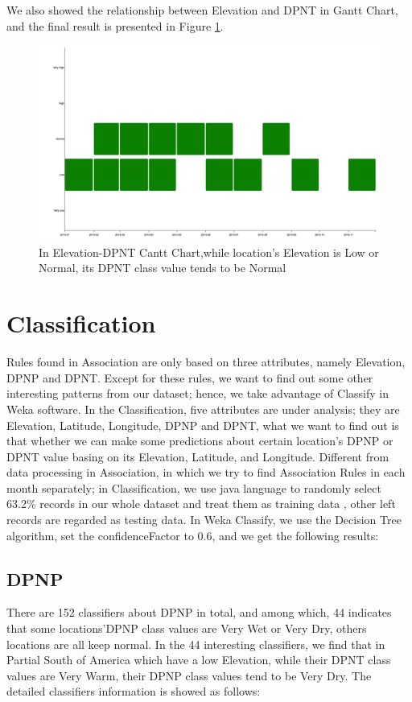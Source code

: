 \documentclass[11pt]{article}
\begin{document}
We also showed the relationship between Elevation and DPNT in Gantt Chart, and the final result is presented in Figure \ref{fig:Gantt Chart for DPNT}.

\begin{figure}
  \centering
  \includegraphics[width=\textwidth]{fig/ganttchart-dpnt.png}
  \caption{In Elevation-DPNT Cantt Chart,while location's Elevation is Low or Normal, its DPNT class value tends to be Normal}
  \label{fig:Gantt Chart for DPNT}
  \vspace{-0.1 in}
\end{figure}

\section{Classification}
Rules found in Association are only based on three attributes, namely Elevation, DPNP and DPNT.  Except for these rules, we want to find out some other interesting patterns from our dataset; hence, we take advantage of Classify in Weka software.  In the Classification, five attributes are under analysis; they are Elevation, Latitude, Longitude, DPNP and DPNT, what we want to find out is that whether we can make some predictions about certain location\rq s DPNP or DPNT value basing on its Elevation, Latitude, and Longitude.  Different from data processing in Association, in which we try to find Association Rules in each month separately; in Classification, we use java language to randomly select 63.2\% records in our whole dataset and treat them as training data , other left records are regarded as testing data.  In Weka Classify, we use the Decision Tree algorithm, set the confidenceFactor to 0.6, and we get the following results:

\subsection{DPNP}
There are 152 classifiers about DPNP in total, and among which,   44 indicates that some locations\rq DPNP class values are Very Wet or Very Dry, others locations are all keep normal.  In the 44 interesting classifiers, we find that in Partial South of America which have a low Elevation, while their DPNT class values are Very Warm, their DPNP class values tend to be Very Dry. The detailed classifiers information is showed as follows:
\end{document}
